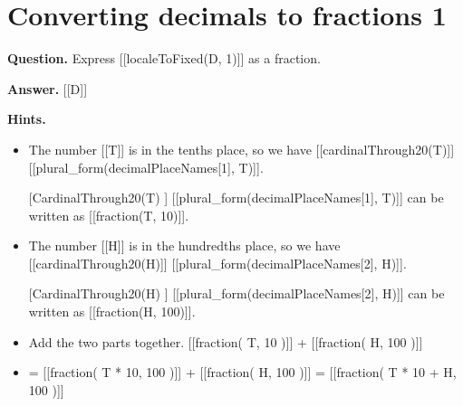 \documentclass{article}
\begin{document}
\section*{Converting decimals to fractions 1}
\textbf{Question.} Express [[localeToFixed(D, 1)]] as a fraction.

\textbf{Answer.} [[D]]

\textbf{Hints.}
\begin{itemize}
  \item The number [[T]] is in the tenths place,
                    so we have [[cardinalThrough20(T)]] [[plural\_form(decimalPlaceNames[1], T)]].
  \item [[CardinalThrough20(T)]] [[plural\_form(decimalPlaceNames[1], T)]]
                    can be written as [[fraction(T, 10)]].
  \item The number [[H]] is in the hundredths place,
                    so we have [[cardinalThrough20(H)]] [[plural\_form(decimalPlaceNames[2], H)]].
  \item [[CardinalThrough20(H)]] [[plural\_form(decimalPlaceNames[2], H)]]
                    can be written as [[fraction(H, 100)]].
  \item Add the two parts together.
                    [[fraction( T, 10 )]] + [[fraction( H, 100 )]]
  \item = [[fraction( T * 10, 100 )]] + [[fraction( H, 100 )]]
                    = [[fraction( T * 10 + H, 100 )]]
\end{itemize}
\end{document}
